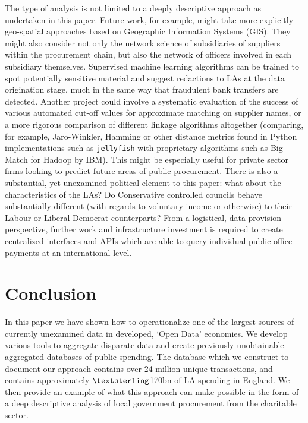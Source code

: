 \documentclass[12pt]{article}
\begin{document}
The type of analysis is not limited to a deeply descriptive approach as undertaken in this paper. Future work, for example, might take more explicitly geo-spatial approaches based on Geographic Information Systems (GIS). They might also consider not only the network science of subsidiaries of suppliers within the procurement chain, but also the network of officers involved in each subsidiary themselves. Supervised machine learning algorithms can be trained to spot potentially sensitive material and suggest redactions to LAs at the data origination stage, much in the same way that fraudulent bank transfers are detected. Another project could involve a systematic evaluation of the success of various automated cut-off values for approximate matching on supplier names, or a more rigorous comparison of different linkage algorithms altogether (comparing, for example, Jaro-Winkler, Hamming or other distance metrics found in Python implementations such as \texttt{jellyfish} with proprietary algorithms such as Big Match for Hadoop by IBM). This might be especially useful for private sector firms looking to predict future areas of public procurement. There is also a substantial, yet unexamined political element to this paper: what about the characteristics of the LAs? Do Conservative controlled councils behave substantially different (with regards to voluntary income or otherwise) to their Labour or Liberal Democrat counterparts? From a logistical, data provision perspective, further work and infrastructure investment is required to create centralized interfaces and APIs which are able to query individual public office payments at an international level.

\section{Conclusion}\label{conclusion}

In this paper we have shown how to operationalize one of the largest sources of currently unexamined data in developed, `Open Data’ economies. We develop various tools to aggregate disparate data and create previously unobtainable aggregated databases of public spending. The database which we construct to document our approach contains over 24 million unique transactions, and contains approximately $\textsterling$170bn of LA spending in England. We then provide an example of what this approach can make possible in the form of a deep descriptive analysis of local government procurement from the charitable sector.
\end{document}
